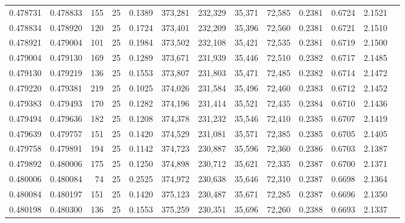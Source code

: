 \begin{tabular}{rrrrrrrrrrrrr}
0.478731 & 0.478833 &   155 &  25 &                                     0.1389 & 373,281 & 232,329 &  35,371 &  72,585 & 0.2381 & 0.6724 & 2.1521 \\
0.478834 & 0.478920 &   120 &  25 &                                     0.1724 & 373,401 & 232,209 &  35,396 &  72,560 & 0.2381 & 0.6721 & 2.1510 \\
0.478921 & 0.479004 &   101 &  25 &                                     0.1984 & 373,502 & 232,108 &  35,421 &  72,535 & 0.2381 & 0.6719 & 2.1500 \\
0.479004 & 0.479130 &   169 &  25 &                                     0.1289 & 373,671 & 231,939 &  35,446 &  72,510 & 0.2382 & 0.6717 & 2.1485 \\
0.479130 & 0.479219 &   136 &  25 &                                     0.1553 & 373,807 & 231,803 &  35,471 &  72,485 & 0.2382 & 0.6714 & 2.1472 \\
0.479220 & 0.479381 &   219 &  25 &                                     0.1025 & 374,026 & 231,584 &  35,496 &  72,460 & 0.2383 & 0.6712 & 2.1452 \\
0.479383 & 0.479493 &   170 &  25 &                                     0.1282 & 374,196 & 231,414 &  35,521 &  72,435 & 0.2384 & 0.6710 & 2.1436 \\
0.479494 & 0.479636 &   182 &  25 &                                     0.1208 & 374,378 & 231,232 &  35,546 &  72,410 & 0.2385 & 0.6707 & 2.1419 \\
0.479639 & 0.479757 &   151 &  25 &                                     0.1420 & 374,529 & 231,081 &  35,571 &  72,385 & 0.2385 & 0.6705 & 2.1405 \\
0.479758 & 0.479891 &   194 &  25 &                                     0.1142 & 374,723 & 230,887 &  35,596 &  72,360 & 0.2386 & 0.6703 & 2.1387 \\
0.479892 & 0.480006 &   175 &  25 &                                     0.1250 & 374,898 & 230,712 &  35,621 &  72,335 & 0.2387 & 0.6700 & 2.1371 \\
0.480006 & 0.480084 &    74 &  25 &                                     0.2525 & 374,972 & 230,638 &  35,646 &  72,310 & 0.2387 & 0.6698 & 2.1364 \\
0.480084 & 0.480197 &   151 &  25 &                                     0.1420 & 375,123 & 230,487 &  35,671 &  72,285 & 0.2387 & 0.6696 & 2.1350 \\
0.480198 & 0.480300 &   136 &  25 &                                     0.1553 & 375,259 & 230,351 &  35,696 &  72,260 & 0.2388 & 0.6693 & 2.1337 \\

\end{tabular}
